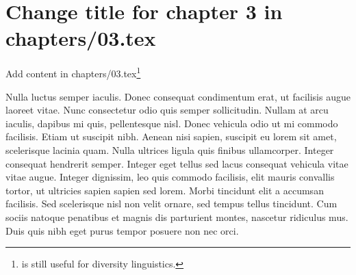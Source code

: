 \chapter{Change title for chapter 3 in chapters/03.tex}
Add content in chapters/03.tex\footnote{\citet{Comrie1981} is still useful for diversity linguistics. }

Nulla luctus semper iaculis. Donec consequat condimentum erat, ut facilisis augue laoreet vitae. Nunc consectetur odio quis semper sollicitudin. Nullam at arcu iaculis, dapibus mi quis, pellentesque nisl. Donec vehicula odio ut mi commodo facilisis. Etiam ut suscipit nibh. Aenean nisi sapien, suscipit eu lorem sit amet, scelerisque lacinia quam. Nulla ultrices ligula quis finibus ullamcorper. Integer consequat hendrerit semper. Integer eget tellus sed lacus consequat vehicula vitae vitae augue. Integer dignissim, leo quis commodo facilisis, elit mauris convallis tortor, ut ultricies sapien sapien sed lorem. Morbi tincidunt elit a accumsan facilisis. Sed scelerisque nisl non velit ornare, sed tempus tellus tincidunt. Cum sociis natoque penatibus et magnis dis parturient montes, nascetur ridiculus mus. Duis quis nibh eget purus tempor posuere non nec orci. 